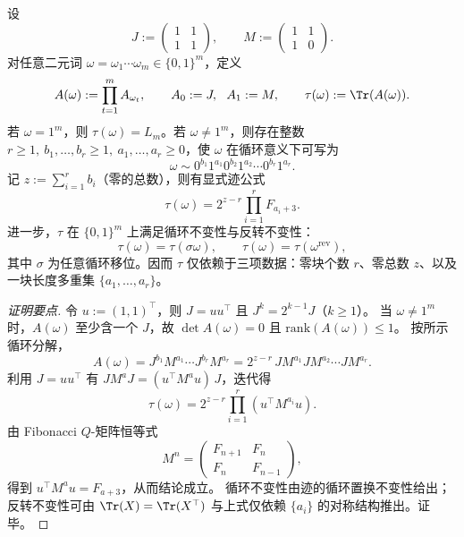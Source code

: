 \begin{conclusion}\label{con:xi-terminal-replica-softcore-binary-wordtrace-dihedral-normal-form}
设
\[
J:=\begin{pmatrix}1&1\\[2pt]1&1\end{pmatrix},
\qquad
M:=\begin{pmatrix}1&1\\[2pt]1&0\end{pmatrix}.
\]
对任意二元词 \(\omega=\omega_1\cdots \omega_m\in\{0,1\}^m\)，定义
\[
A(\omega):=\prod_{t=1}^{m}A_{\omega_t},
\qquad
A_0:=J,\ \ A_1:=M,
\qquad
\tau(\omega):=\Tr(A(\omega)).
\]
若 \(\omega=1^m\)，则 \(\tau(\omega)=L_m\)。若 \(\omega\neq 1^m\)，则存在整数
\(
r\ge 1,\ b_1,\dots,b_r\ge 1,\ a_1,\dots,a_r\ge 0
\)，使 \(\omega\) 在循环意义下可写为
\[
\omega\sim 0^{b_1}1^{a_1}0^{b_2}1^{a_2}\cdots 0^{b_r}1^{a_r}.
\]
记 \(z:=\sum_{i=1}^{r}b_i\)（零的总数），则有显式迹公式
\[
\tau(\omega)=2^{z-r}\prod_{i=1}^{r}F_{a_i+3}.
\]
进一步，\(\tau\) 在 \(\{0,1\}^m\) 上满足循环不变性与反转不变性：
\[
\tau(\omega)=\tau(\sigma\omega),\qquad
\tau(\omega)=\tau(\omega^{\mathrm{rev}}),
\]
其中 \(\sigma\) 为任意循环移位。因而 \(\tau\) 仅依赖于三项数据：零块个数 \(r\)、零总数 \(z\)、以及一块长度多重集 \(\{a_1,\dots,a_r\}\)。
\end{conclusion}
\begin{proof}[证明要点]
令 \(u:=(1,1)^{\top}\)，则 \(J=uu^{\top}\) 且 \(J^k=2^{k-1}J\)（\(k\ge 1\)）。
当 \(\omega\neq 1^m\) 时，\(A(\omega)\) 至少含一个 \(J\)，故 \(\det A(\omega)=0\) 且 \(\mathrm{rank}(A(\omega))\le 1\)。
按所示循环分解，
\[
A(\omega)=J^{b_1}M^{a_1}\cdots J^{b_r}M^{a_r}
=2^{z-r}\,J M^{a_1}J M^{a_2}\cdots J M^{a_r}.
\]
利用 \(J=uu^{\top}\) 有
\(
J M^a J=(u^{\top}M^a u)\,J
\)，迭代得
\[
\tau(\omega)=2^{z-r}\prod_{i=1}^{r}(u^{\top}M^{a_i}u).
\]
由 Fibonacci \(Q\)-矩阵恒等式
\[
M^n=
\begin{pmatrix}
F_{n+1}&F_n\\[2pt]
F_n&F_{n-1}
\end{pmatrix},
\]
得到 \(u^{\top}M^a u=F_{a+3}\)，从而结论成立。
循环不变性由迹的循环置换不变性给出；反转不变性可由
\(\Tr(X)=\Tr(X^{\top})\) 与上式仅依赖 \(\{a_i\}\) 的对称结构推出。证毕。
\end{proof}

